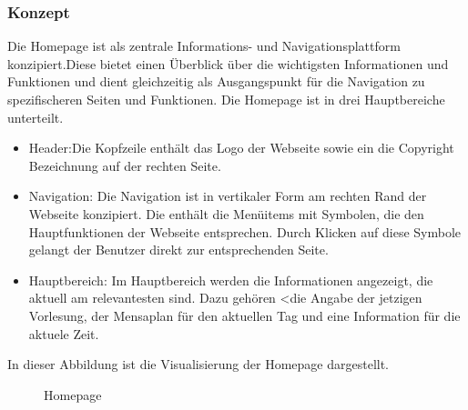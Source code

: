 \subsubsection{Konzept}
Die Homepage ist als zentrale Informations- und Navigationsplattform konzipiert.Diese bietet einen  Überblick über die wichtigsten Informationen und Funktionen und dient gleichzeitig als Ausgangspunkt für die Navigation zu spezifischeren Seiten und Funktionen.  
Die Homepage ist in drei Hauptbereiche unterteilt.
\begin{itemize}
	\item Header:Die Kopfzeile enthält das Logo der Webseite sowie ein die Copyright Bezeichnung auf der rechten Seite. 
	\item Navigation: Die Navigation ist  in vertikaler Form am rechten Rand der Webseite konzipiert. Die enthält die Menüitems mit Symbolen, die den Hauptfunktionen der Webseite entsprechen. Durch Klicken auf diese Symbole gelangt der Benutzer direkt zur entsprechenden Seite.
	\item  Hauptbereich: Im Hauptbereich werden die Informationen angezeigt, die aktuell am relevantesten sind. Dazu gehören <die Angabe der jetzigen Vorlesung, der Mensaplan für den aktuellen Tag und eine Information für die aktuele Zeit.
\end{itemize} 
In dieser Abbildung ist die Visualisierung der Homepage dargestellt.\newpage
\begin{figure}[htbp]
	\centering
	\caption{Homepage}
\end{figure}
